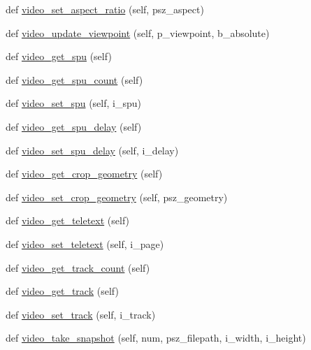 \begin{DoxyCompactItemize}
\item 
def \hyperlink{classvlc_1_1_media_player_af2cb8a29a559902d75d2b58dcad3e938}{video\+\_\+set\+\_\+aspect\+\_\+ratio} (self, psz\+\_\+aspect)
\item 
def \hyperlink{classvlc_1_1_media_player_ad248ed33e6ee4b9f0de5627464010857}{video\+\_\+update\+\_\+viewpoint} (self, p\+\_\+viewpoint, b\+\_\+absolute)
\item 
def \hyperlink{classvlc_1_1_media_player_ae9a4f3a68dcd0bbb7d630ba3109fd378}{video\+\_\+get\+\_\+spu} (self)
\item 
def \hyperlink{classvlc_1_1_media_player_a57b4b64ec9386749a6b4b16e2578423c}{video\+\_\+get\+\_\+spu\+\_\+count} (self)
\item 
def \hyperlink{classvlc_1_1_media_player_a41db63f2adaa98b00917f7090c1413e6}{video\+\_\+set\+\_\+spu} (self, i\+\_\+spu)
\item 
def \hyperlink{classvlc_1_1_media_player_a0740b3afdcb610907d0c82358d09f5a6}{video\+\_\+get\+\_\+spu\+\_\+delay} (self)
\item 
def \hyperlink{classvlc_1_1_media_player_ae4fb19229a13d2a7b6a16b37d083244b}{video\+\_\+set\+\_\+spu\+\_\+delay} (self, i\+\_\+delay)
\item 
def \hyperlink{classvlc_1_1_media_player_ab120cd3adba77eb2cbaa9e65eb279ae8}{video\+\_\+get\+\_\+crop\+\_\+geometry} (self)
\item 
def \hyperlink{classvlc_1_1_media_player_a8fb5c5ae9f3a3f03ff8b286a8b2f07f9}{video\+\_\+set\+\_\+crop\+\_\+geometry} (self, psz\+\_\+geometry)
\item 
def \hyperlink{classvlc_1_1_media_player_a555e37de8f91b1de2d6991bfc19d01b2}{video\+\_\+get\+\_\+teletext} (self)
\item 
def \hyperlink{classvlc_1_1_media_player_a6ae8dbb8920db989e75b4fe94b0a3df7}{video\+\_\+set\+\_\+teletext} (self, i\+\_\+page)
\item 
def \hyperlink{classvlc_1_1_media_player_a2fbaacd793c681e340c5b62022e60f0b}{video\+\_\+get\+\_\+track\+\_\+count} (self)
\item 
def \hyperlink{classvlc_1_1_media_player_a62cfcb86df91b965626e78487c6f7474}{video\+\_\+get\+\_\+track} (self)
\item 
def \hyperlink{classvlc_1_1_media_player_a4e425c5d1cb8aa16fc59321650801def}{video\+\_\+set\+\_\+track} (self, i\+\_\+track)
\item 
def \hyperlink{classvlc_1_1_media_player_aa8c63c57da5e893491429ce65cb18c02}{video\+\_\+take\+\_\+snapshot} (self, num, psz\+\_\+filepath, i\+\_\+width, i\+\_\+height)

\end{DoxyCompactItemize}
